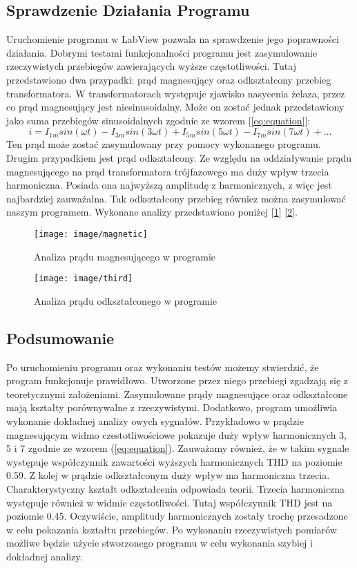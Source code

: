 \documentclass{article} %
\newcommand{\forceindent}{\leavevmode{\parindent=1cm\indent}} %
\begin{document}
		\subsection{Sprawdzenie Działania Programu}
			\forceindent Uruchomienie programu w LabView pozwala na sprawdzenie jego poprawności działania. Dobrymi testami funkcjonalności programu jest zasymulowanie rzeczywistych przebiegów zawierających wyższe częstotliwości. Tutaj przedstawiono dwa przypadki: prąd magnesujący oraz odkształcony przebieg transformatora. W transformatorach występuje zjawisko nasycenia żelaza, przez co prąd magnesujący jest niesinusoidalny. Może on zostać jednak przedstawiony jako suma przebiegów sinusoidalnych zgodnie ze wzorem [\ref{eq:equation}]: 
			\begin{equation}
				i=I_{1m}sin(\omega t)-I_{3m}sin(3\omega t)+I_{5m}sin(5\omega t)-I_{7m}sin(7\omega t)+...
				\label{eq:equation}
			\end{equation}
			\forceindent Ten prąd może zostać zasymulowany przy pomocy wykonanego programu. Drugim przypadkiem jest prąd odkształcony. Ze względu na oddziaływanie prądu magnesującego na prąd transformatora trójfazowego ma duży wpływ trzecia harmoniczna. Posiada ona najwyższą amplitudę z harmonicznych, z więc jest najbardziej zauważalna. Tak odkształcony przebieg równiez można zasymulować naszym programem. Wykonane analizy przedstawiono poniżej [\ref{fig:magnetic}] [\ref{fig:third}].
			\newpage \forceindent
			\begin{figure}[h!]
				\centering
				\texttt{[image: image/magnetic]}
				\caption[Prąd Magnesujący]{Analiza prądu magnesującego w programie}
				\label{fig:magnetic}
			\end{figure}
		\newpage \forceindent
		\begin{figure}[h!]
			\centering
			\texttt{[image: image/third]}
			\caption[Prąd Odkształcony]{Analiza prądu odkształconego w programie}
			\label{fig:third}
		\end{figure}
		\subsection{Podsumowanie}
			\forceindent Po uruchomieniu programu oraz wykonaniu testów możemy stwierdzić, że program funkcjonuje prawidłowo. Utworzone przez niego przebiegi zgadzają się z teoretycznymi założeniami. Zasymulowane prądy magnesujące oraz odkształcone mają kształty porównywalne z rzeczywistymi. Dodatkowo, program umożliwia wykonanie dokładnej analizy owych sygnałów. Przykładowo w prądzie magnesującym widmo czestotliwościowe pokazuje duży wpływ harmonicznych 3, 5 i 7 zgodnie ze wzorem (\ref{eq:equation}). Zauważamy również, że w takim sygnale występuje współczynnik zawartości wyższych harmonicznych THD na poziomie 0.59. Z kolej w prądzie odkształconym duży wpływ ma harmoniczna trzecia. Charakterystyczny kształt odkształcenia odpowiada teorii. Trzecia harmoniczna występuje również w widmie częstotliwości. Tutaj współczynnik THD jest na poziomie 0.45. Oczywiście, amplitudy harmonicznych zostały trochę przesadzone w celu pokazania kształtu przebiegów. Po wykonaniu rzeczywistych pomiarów możliwe będzie użycie stworzonego programu w celu wykonania szybiej i dokładnej analizy.
\end{document}
